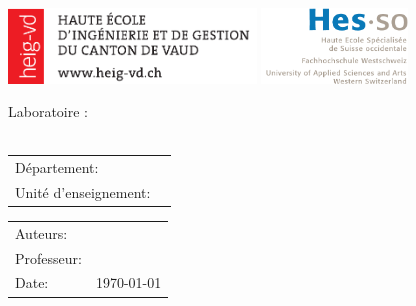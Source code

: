 


\begin{center}
\includegraphics[height=2cm]{./images/logo_heig.pdf}
\hfill \includegraphics[height=2cm]{./images/logo_hesso.pdf}
\end{center}

\vfill

\begin{center}
	\Large Laboratoire \nbrlabo:\\
	\huge \titre \\
\end{center}


\begin{center}
	\begin{tabular}{l l}
		Département:          & \departement\\
		Unité d'enseignement: & \cours\\
	\end{tabular}
\end{center}


\vfill
\vfill
\vfill
\vfill
\vfill
\vfill
\vfill
\vfill
\vfill
\vfill
\vfill
\vfill


\vfill

\begin{tabular}{l l}
	\Large	Auteurs:		& \Large \nomAuteur\\
	Professeur:				& \prof\\
	Date:					& \today\\
\end{tabular}

\vfill


